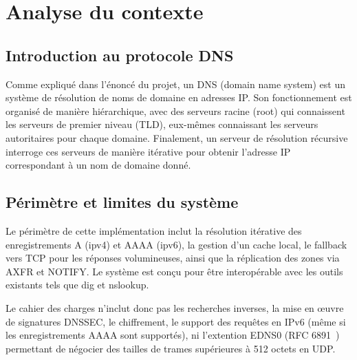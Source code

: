 \section{Analyse du contexte}
\subsection{Introduction au protocole DNS}
Comme expliqué dans l'énoncé du projet, un DNS (domain name system) est un système de résolution de noms de domaine en adresses IP.
Son fonctionnement est organisé de manière hiérarchique, avec des serveurs racine (root) qui connaissent les serveurs de premier niveau (TLD), eux-mêmes connaissant les serveurs autoritaires pour chaque domaine.
Finalement, un serveur de résolution récursive interroge ces serveurs de manière itérative pour obtenir l'adresse IP correspondant à un nom de domaine donné.



\subsection{Périmètre et limites du système}
Le périmètre de cette implémentation inclut la résolution itérative des enregistrements A (ipv4) et AAAA (ipv6),
la gestion d'un cache local, le fallback vers TCP pour les réponses volumineuses,
ainsi que la réplication des zones via AXFR et NOTIFY.
Le système est conçu pour être interopérable avec les outils existants tels que dig et nslookup.

Le cahier des charges n'inclut donc pas les recherches inverses, la mise en œuvre de signatures DNSSEC, le chiffrement, le support des requêtes en IPv6 (même si les enregistrements AAAA sont supportés), ni l'extention EDNS0 (RFC 6891~\cite{rfc6891}) permettant de négocier des tailles de trames supérieures à 512 octets en UDP.

